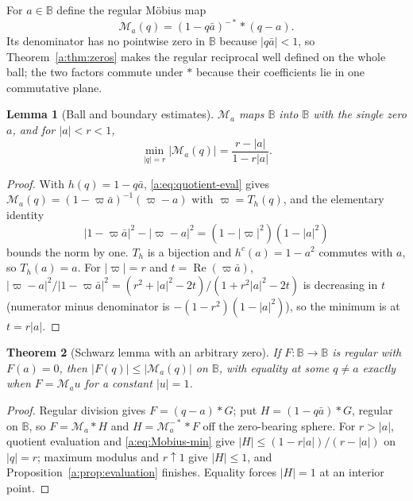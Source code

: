 \documentclass[11pt,a4paper]{article}
\numberwithin{equation}{section}
\newtheorem{theorem}{Theorem}[section]
\newtheorem{lemma}[theorem]{Lemma}
\theoremstyle{definition}
\theoremstyle{remark}
\theoremstyle{plain}
\DeclareMathOperator{\Rea}{Re}
\newcommand{\abs}[1]{\lvert #1\rvert}
\begin{document}
For $a\in\mathbb B$ define the regular M\"obius map
\begin{equation}
 \mathcal M_a(q)=(1-q\bar a)^{-*}*(q-a).
 \label{a:eq:Mobius}
\end{equation}
Its denominator has no pointwise zero in $\mathbb B$ because
$\abs{q\bar a}<1$, so Theorem~\ref{a:thm:zeros} makes the regular reciprocal
well defined on the whole ball; the two factors commute under $*$ because
their coefficients lie in one commutative plane.

\begin{lemma}[Ball and boundary estimates]
\label{a:lem:Mobius}
$\mathcal M_a$ maps $\mathbb B$ into $\mathbb B$ with the single zero $a$, and
for $\abs a<r<1$,
\begin{equation}
 \min_{\abs q=r}\abs{\mathcal M_a(q)}=\frac{r-\abs a}{1-r\abs a}.
 \label{a:eq:Mobius-min}
\end{equation}
\end{lemma}

\begin{proof}
With $h(q)=1-q\bar a$, \eqref{a:eq:quotient-eval} gives
$\mathcal M_a(q)=(1-\varpi\bar a)^{-1}(\varpi-a)$ with $\varpi=T_h(q)$, and the
elementary identity
\begin{equation}
 \abs{1-\varpi\bar a}^2-\abs{\varpi-a}^2=(1-\abs\varpi^2)(1-\abs a^2)
 \label{a:eq:ballidentity}
\end{equation}
bounds the norm by one. $T_h$ is a bijection and $h^c(a)=1-a^2$ commutes with
$a$, so $T_h(a)=a$. For $\abs\varpi=r$ and $t=\Rea(\varpi\bar a)$,
$\abs{\varpi-a}^2/\abs{1-\varpi\bar a}^2=(r^2+\abs a^2-2t)/(1+r^2\abs a^2-2t)$
is decreasing in $t$ (numerator minus denominator is $-(1-r^2)(1-\abs a^2)$),
so the minimum is at $t=r\abs a$.
\end{proof}

\begin{theorem}[Schwarz lemma with an arbitrary zero]
\label{a:thm:schwarz-zero}
If $F:\mathbb B\to\mathbb B$ is regular with $F(a)=0$, then
$\abs{F(q)}\le\abs{\mathcal M_a(q)}$ on $\mathbb B$, with equality at some
$q\ne a$ exactly when $F=\mathcal M_au$ for a constant $\abs u=1$.
\end{theorem}

\begin{proof}
Regular division gives $F=(q-a)*G$; put $H=(1-q\bar a)*G$, regular on
$\mathbb B$, so $F=\mathcal M_a*H$ and $H=\mathcal M_a^{-*}*F$ off the
zero-bearing sphere. For $r>\abs a$, quotient evaluation and
\eqref{a:eq:Mobius-min} give $\abs{H}\le(1-r\abs a)/(r-\abs a)$ on
$\abs q=r$; maximum modulus and $r\uparrow1$ give $\abs H\le1$, and
Proposition~\ref{a:prop:evaluation} finishes. Equality forces $\abs H=1$ at an
interior point.
\end{proof}
\end{document}
